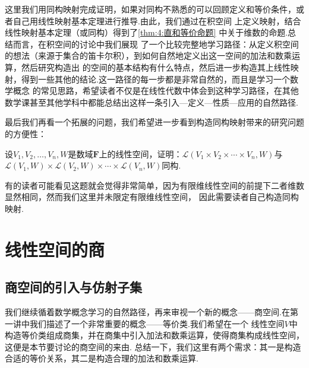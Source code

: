 这里我们用同构映射完成证明，如果对同构不熟悉的可以回顾定义和等价条件，或者自己用线性映射基本定理进行推导.由此，我们通过在积空间
上定义映射，结合线性映射基本定理（或同构）得到了\autoref{thm:4:直和等价命题} 中关于维数的命题.总结而言，在积空间的讨论中我们展现
了一个比较完整地学习路径：从定义积空间的想法（来源于集合的笛卡尔积），到如何自然地定义出这一空间的加法和数乘运算，然后研究构造出
的空间的基本结构有什么特点，然后进一步构造其上线性映射，得到一些其他的结论.这一路径的每一步都是非常自然的，而且是学习一个数学概念
的常见思路，希望读者不仅是在线性代数中体会到这种学习路径，在其他数学课甚至其他学科中都能总结出这样一条引入—定义—性质—应用的自然路径.

最后我们再看一个拓展的问题，我们希望进一步看到构造同构映射带来的研究问题的方便性：
\begin{example}
    设$V_1,V_2,\ldots,V_n,W$是数域$\mathbf{F}$上的线性空间，证明：$\mathcal{L}(V_1 \times V_2 \times \cdots \times V_n,W)$与
    $\mathcal{L}(V_1,W) \times \mathcal{L}(V_2,W) \times \cdots \times \mathcal{L}(V_n,W)$同构.
\end{example}
有的读者可能看见这题就会觉得非常简单，因为有限维线性空间的前提下二者维数显然相同，然而我们这里并未限定有限维线性空间，
因此需要读者自己构造同构映射.

\begin{solution}

\end{solution}

\section{线性空间的商}
\subsection{商空间的引入与仿射子集}
我们继续循着数学概念学习的自然路径，再来审视一个新的概念——商空间.在第一讲中我们描述了一个非常重要的概念——等价类.我们希望在一个
线性空间$V$中构造等价类组成商集，并在商集中引入加法和数乘运算，使得商集构成线性空间，这便是本节要讨论的商空间的来由.
总结一下，我们这里有两个需求：其一是构造合适的等价关系，其二是构造合理的加法和数乘运算.

